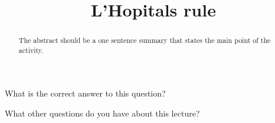 \documentclass{ximera}
\title{L'Hopitals rule}
\begin{document}
\begin{abstract}
  The abstract should be a one sentence summary that states the main point of the activity.
\end{abstract}

\maketitle

\begin{question}
  What is the correct answer to this question?

  
    \begin{multipleChoice}
    \end{multipleChoice}  
  
\end{question}

What other questions do you have about this lecture?
\begin{question}
  \begin{freeResponse}
  \end{freeRepsonse}
\end{question}
\end{document}

